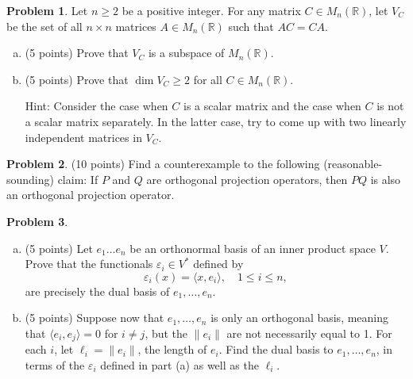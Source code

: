 \documentclass[11pt,oneside]{amsart}
\theoremstyle{definition}
\newtheorem{problem}{Problem}
\newcommand{\bR}{\mathbb{R}}
\newcommand{\eps}{\varepsilon}
\begin{document}
    \begin{problem}
        Let $n\geq 2$ be a positive integer. For any matrix $C\in M_n(\bR)$, let $V_C$ be the set of all $n\times n$ matrices $A\in M_n(\bR)$ such that $AC=CA$.
        \begin{enumerate}[(a)]
            \item (5 points) Prove that $V_C$ is a subspace of $M_n(\bR)$.
            \vfill
            \item (5 points) Prove that $\dim V_C\geq 2$ for all $C\in M_n(\bR)$.

            Hint: Consider the case when $C$ is a scalar matrix and the case when $C$ is not a scalar matrix separately. In the latter case, try to come up with two linearly independent matrices in $V_C$.
            \vfill
        \end{enumerate}
    \end{problem}
    
    \begin{problem}
        (10 points) Find a counterexample to the following (reasonable-sounding) claim: If $P$ and $Q$ are orthogonal projection operators, then $PQ$ is also an orthogonal projection operator.
    \end{problem}
    

    
    \begin{problem}
        \leavevmode\begin{enumerate}[(a)]
            \item (5 points) Let $e_1\dots e_n$ be an orthonormal basis of an inner product space $V$. Prove that the functionals $\eps_i\in V^*$ defined by
            \[\eps_i(x)=\langle x, e_i\rangle, \quad 1\leq i\leq n,\]
            are precisely the dual basis of $e_1,\dots,e_n$.
            \vfill

            \item (5 points) Suppose now that $e_1,\dots,e_n$ is only an orthogonal basis, meaning that $\langle e_i,e_j\rangle=0$ for $i\neq j$, but the $\|e_i\|$ are not necessarily equal to 1. For each $i$, let $\ell_i=\|e_i\|$, the length of $e_i$. Find the dual basis to $e_1,\dots,e_n$, in terms of the $\eps_i$ defined in part (a) as well as the $\ell_i$.
            \vfill
        \end{enumerate}
    \end{problem}
\end{document}
